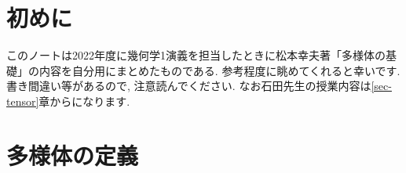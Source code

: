 \documentclass[dvipdfmx,a4paper,11pt]{article}
\theoremstyle{definition}
\begin{document}
\begin{comment}
    \end{dfn}
    \end{tcolorbox}
    
    
\begin{center}
{\Large 5-6 ベクトル場と積分曲線}
\end{center}
\begin{flushright}
 岩井雅崇 2022/11/18
\end{flushright}


前回の演習の授業で少々気になった点があったので, 何点か補足する.

\end{comment}

\section{初めに}

このノートは2022年度に幾何学1演義を担当したときに松本幸夫著「多様体の基礎」の内容を自分用にまとめたものである.
参考程度に眺めてくれると幸いです. 書き間違い等があるので, 注意読んでください. 
なお石田先生の授業内容は\ref{sec-tensor}章からになります.

\section{多様体の定義}
\end{document}
